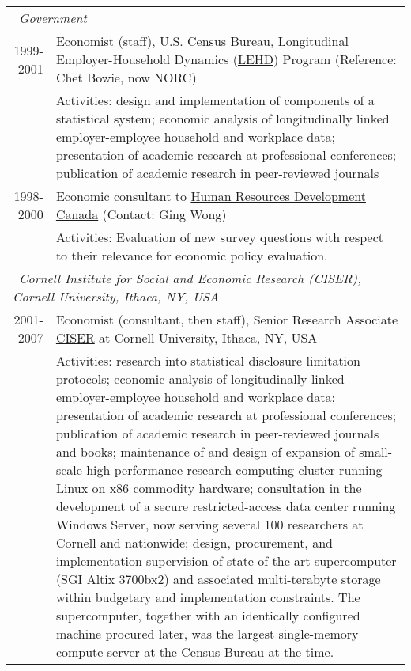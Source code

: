 \documentclass[10pt,letterpaper]{report}
\begin{document}
\begin{longtable}{rp{5in}}
\multicolumn{2}{l}{\ \it Government}\\

1999-2001    &Economist (staff), U.S. Census Bureau, Longitudinal
Employer-Household Dynamics (\href{http://lehd.dsd.census.gov}{LEHD})
Program (Reference: Chet Bowie, now NORC)\\%
&Activities: design and implementation of components of a
statistical system; economic analysis of
longitudinally linked employer-employee household and workplace
data; presentation of academic research at professional
conferences; publication of academic research in peer-reviewed
journals\\
1998-2000    &Economic consultant to
\href{http://www.hrdc-drhc.gc.ca/}{Human Resources Development Canada}
(Contact: Ging Wong)\\
&Activities: Evaluation of new survey questions with respect to
their relevance for economic policy evaluation.\\[.3cm]
% 
%
\multicolumn{2}{l}{\ \it Cornell Institute for Social and Economic
  Research (CISER), Cornell University, Ithaca, NY, USA}\\
2001-2007    & Economist (consultant, then staff), Senior Research Associate 
\href{http://www.ciser.cornell.edu}{CISER} at Cornell University, Ithaca,
NY, USA %
\\%
         &Activities: research into statistical
         disclosure limitation protocols; economic analysis of
         longitudinally linked employer-employee household and workplace
         data; presentation of academic research at professional
         conferences; publication of academic research in peer-reviewed
         journals and books; maintenance of and design of expansion of small-scale high-performance
         research computing cluster running Linux on x86 commodity
         hardware; consultation in the development of a secure
         restricted-access data center running Windows Server, now serving
         several 100 researchers at Cornell and nationwide; design,
         procurement, and implementation supervision of state-of-the-art
         supercomputer (SGI Altix 3700bx2) and associated multi-terabyte
         storage within budgetary and implementation constraints. The
         supercomputer, together with an identically configured machine
         procured later, was the largest single-memory compute
         server at the Census Bureau at the time.\\


\end{longtable}
\end{document}
